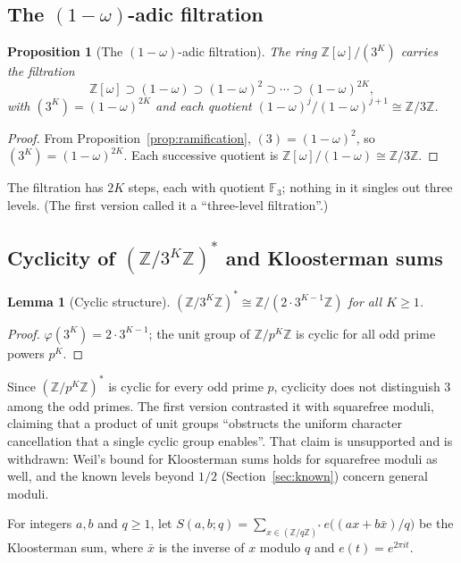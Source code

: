 \documentclass[12pt]{amsart}
\theoremstyle{plain}
\newtheorem{proposition}[theorem]{Proposition}
\newtheorem{lemma}[theorem]{Lemma}
\theoremstyle{definition}
\theoremstyle{remark}
\newcommand{\Z}{\mathbb{Z}}
\newcommand{\Zomega}{\Z[\omega]}
\begin{document}
\subsection{The $(1-\omega)$-adic filtration}

\begin{proposition}[The $(1-\omega)$-adic filtration]
\label{prop:filtration}
The ring $\Zomega/(3^K)$ carries the filtration
\[
  \Zomega \supset (1-\omega) \supset (1-\omega)^2 \supset \cdots
  \supset (1-\omega)^{2K},
\]
with $(3^K) = (1-\omega)^{2K}$ and each quotient
$(1-\omega)^j/(1-\omega)^{j+1} \cong \Z/3\Z$.
\end{proposition}

\begin{proof}
From Proposition~\ref{prop:ramification}, $(3) = (1-\omega)^2$, so $(3^K) =
(1-\omega)^{2K}$. Each successive quotient is $\Zomega/(1-\omega) \cong \Z/3\Z$.
\end{proof}

The filtration has $2K$ steps, each with quotient $\mathbb{F}_3$; nothing in it
singles out three levels. (The first version called it a ``three-level
filtration''.)

\subsection{Cyclicity of $(\Z/3^K\Z)^*$ and Kloosterman sums}

\begin{lemma}[Cyclic structure]
\label{lem:cyclic}
$(\Z/3^K\Z)^* \cong \Z/(2 \cdot 3^{K-1}\Z)$ for all $K \geq 1$.
\end{lemma}

\begin{proof}
$\varphi(3^K) = 2 \cdot 3^{K-1}$; the unit group of $\Z/p^K\Z$ is cyclic for
all odd prime powers $p^K$.
\end{proof}

Since $(\Z/p^K\Z)^*$ is cyclic for every odd prime $p$, cyclicity does not
distinguish $3$ among the odd primes. The first version contrasted it with
squarefree moduli, claiming that a product of unit groups ``obstructs the
uniform character cancellation that a single cyclic group enables''. That claim
is unsupported and is withdrawn: Weil's bound for Kloosterman sums holds for
squarefree moduli as well, and the known levels beyond $1/2$ (Section~\ref{sec:known})
concern general moduli.

For integers $a, b$ and $q \geq 1$, let
$S(a, b; q) = \sum_{x \in (\Z/q\Z)^*} e\bigl((a x + b \bar{x})/q\bigr)$ be the
Kloosterman sum, where $\bar{x}$ is the inverse of $x$ modulo $q$ and
$e(t) = e^{2\pi i t}$.
\end{document}
